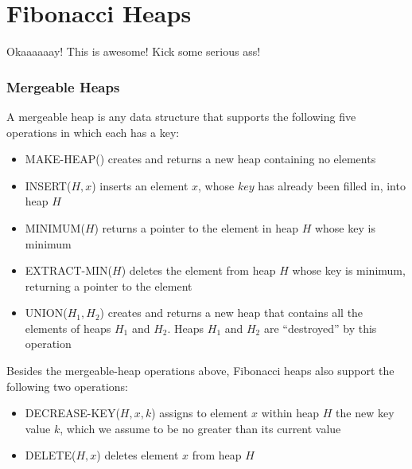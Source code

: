 \section{Fibonacci Heaps}
Okaaaaaay! This is awesome! Kick some serious ass!
%
\subsubsection{Mergeable Heaps}
A mergeable heap is any data structure that supports the following five operations in which each has a key:

\begin{footnotesize}
\begin{itemize}
	\item MAKE-HEAP() creates and returns a new heap containing no elements
	\item INSERT($H, x$) inserts an element $x$, whose $key$ has already been filled in, into heap $H$
	\item MINIMUM($H$) returns a pointer to the element in heap $H$ whose key is minimum
	\item EXTRACT-MIN($H$) deletes the element from heap $H$ whose key is minimum, returning a pointer to the element
	\item UNION($H_1, H_2$) creates and returns a new heap that contains all the elements of heaps $H_1$ and $H_2$. Heaps $H_1$ and $H_2$ are ``destroyed'' by this operation
\end{itemize}
\end{footnotesize}

Besides the mergeable-heap operations above, Fibonacci heaps also support the following two operations:

\begin{footnotesize}
\begin{itemize}
	\item DECREASE-KEY($H, x, k$) assigns to element $x$ within heap $H$ the new key value $k$, which we assume to be no greater than its current value
	\item DELETE($H, x$) deletes element $x$ from heap $H$
\end{itemize}
\end{footnotesize}

